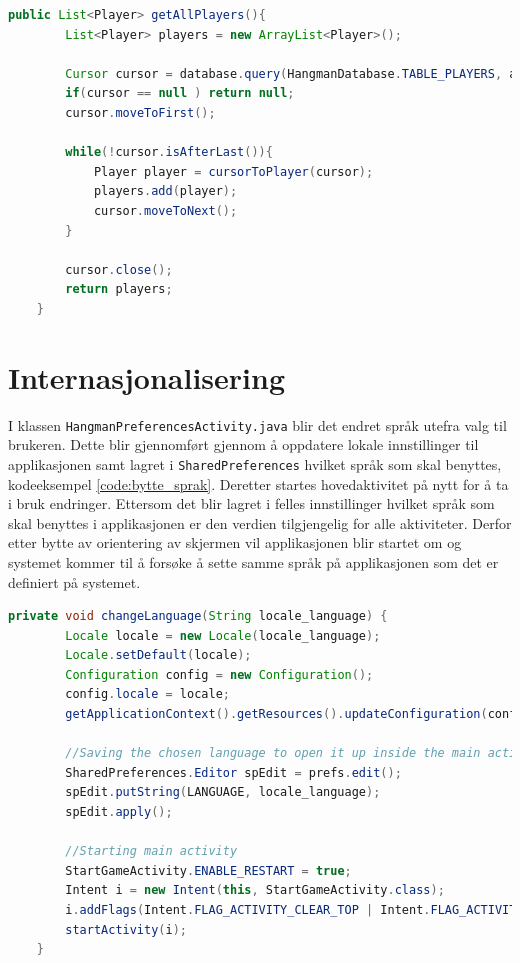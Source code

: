 \begin{lstlisting}[language=Java, caption=Innheting av alle spiller og sortering, label=code:tabell_alle_spillere]
public List<Player> getAllPlayers(){
        List<Player> players = new ArrayList<Player>();

        Cursor cursor = database.query(HangmanDatabase.TABLE_PLAYERS, allColumns, null, null, null, null, HangmanDatabase.COLUMN_SCORE + " DESC");
        if(cursor == null ) return null;
        cursor.moveToFirst();

        while(!cursor.isAfterLast()){
            Player player = cursorToPlayer(cursor);
            players.add(player);
            cursor.moveToNext();
        }

        cursor.close();
        return players;
    }
\end{lstlisting}


\section{Internasjonalisering}
I klassen \texttt{HangmanPreferencesActivity.java} blir det endret språk utefra valg til brukeren. Dette blir gjennomført gjennom å oppdatere lokale innstillinger til applikasjonen samt lagret i \texttt{SharedPreferences} hvilket språk som skal benyttes, kodeeksempel \ref{code:bytte_sprak}. Deretter startes hovedaktivitet på nytt for å ta i bruk endringer. Ettersom det blir lagret i felles innstillinger hvilket språk som skal benyttes i applikasjonen er den verdien tilgjengelig for alle aktiviteter. Derfor etter bytte av orientering av skjermen vil applikasjonen blir startet om og systemet kommer til å forsøke å sette samme språk på applikasjonen som det er definiert på systemet. 

\begin{lstlisting}[language=Java, caption=Metode for språkbytte, label=code:bytte_sprak]
    private void changeLanguage(String locale_language) {
        Locale locale = new Locale(locale_language);
        Locale.setDefault(locale);
        Configuration config = new Configuration();
        config.locale = locale;
        getApplicationContext().getResources().updateConfiguration(config, null);

        //Saving the chosen language to open it up inside the main activity
        SharedPreferences.Editor spEdit = prefs.edit();
        spEdit.putString(LANGUAGE, locale_language);
        spEdit.apply();

        //Starting main activity
        StartGameActivity.ENABLE_RESTART = true;
        Intent i = new Intent(this, StartGameActivity.class);
        i.addFlags(Intent.FLAG_ACTIVITY_CLEAR_TOP | Intent.FLAG_ACTIVITY_SINGLE_TOP);
        startActivity(i);
    }
\end{lstlisting}

